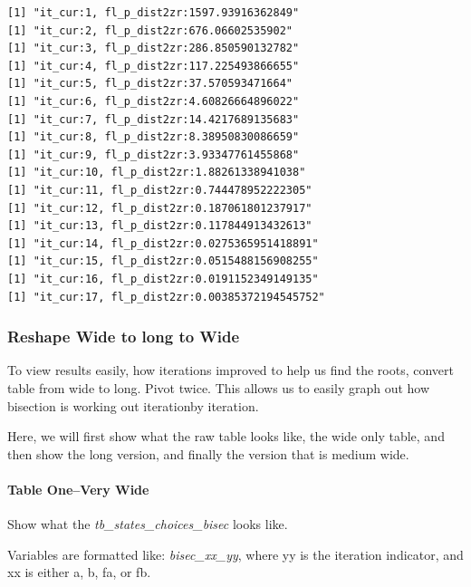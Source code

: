 \documentclass[
]{book}
\newenvironment{Shaded}{\begin{snugshade}}{\end{snugshade}}
\newcommand{\DecValTok}[1]{\textcolor[rgb]{0.00,0.00,0.81}{#1}}
\newcommand{\KeywordTok}[1]{\textcolor[rgb]{0.13,0.29,0.53}{\textbf{#1}}}
\newcommand{\NormalTok}[1]{#1}
\newcommand{\OperatorTok}[1]{\textcolor[rgb]{0.81,0.36,0.00}{\textbf{#1}}}
\newcommand{\StringTok}[1]{\textcolor[rgb]{0.31,0.60,0.02}{#1}}
\begin{document}
\begin{verbatim}
[1] "it_cur:1, fl_p_dist2zr:1597.93916362849"
[1] "it_cur:2, fl_p_dist2zr:676.06602535902"
[1] "it_cur:3, fl_p_dist2zr:286.850590132782"
[1] "it_cur:4, fl_p_dist2zr:117.225493866655"
[1] "it_cur:5, fl_p_dist2zr:37.570593471664"
[1] "it_cur:6, fl_p_dist2zr:4.60826664896022"
[1] "it_cur:7, fl_p_dist2zr:14.4217689135683"
[1] "it_cur:8, fl_p_dist2zr:8.38950830086659"
[1] "it_cur:9, fl_p_dist2zr:3.93347761455868"
[1] "it_cur:10, fl_p_dist2zr:1.88261338941038"
[1] "it_cur:11, fl_p_dist2zr:0.744478952222305"
[1] "it_cur:12, fl_p_dist2zr:0.187061801237917"
[1] "it_cur:13, fl_p_dist2zr:0.117844913432613"
[1] "it_cur:14, fl_p_dist2zr:0.0275365951418891"
[1] "it_cur:15, fl_p_dist2zr:0.0515488156908255"
[1] "it_cur:16, fl_p_dist2zr:0.0191152349149135"
[1] "it_cur:17, fl_p_dist2zr:0.00385372194545752"
\end{verbatim}

\hypertarget{reshape-wide-to-long-to-wide}{%
\subsubsection{Reshape Wide to long to Wide}\label{reshape-wide-to-long-to-wide}}

To view results easily, how iterations improved to help us find the roots, convert table from wide to long. Pivot twice. This allows us to easily graph out how bisection is working out iterationby iteration.

Here, we will first show what the raw table looks like, the wide only table, and then show the long version, and finally the version that is medium wide.

\hypertarget{table-onevery-wide}{%
\paragraph{Table One--Very Wide}\label{table-onevery-wide}}

Show what the \emph{tb\_states\_choices\_bisec} looks like.

Variables are formatted like: \emph{bisec\_xx\_yy}, where yy is the iteration indicator, and xx is either a, b, fa, or fb.

\begin{Shaded}
\end{Shaded}
\end{document}
